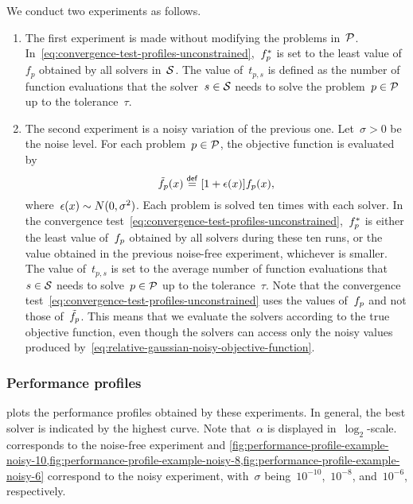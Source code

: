 We conduct two experiments as follows.
\begin{enumerate}
    \item The first experiment is made without modifying the problems in~$\mathcal{P}$.
    In~\cref{eq:convergence-test-profiles-unconstrained},~$f_p^{\ast}$ is set to the least value of~$f_p$ obtained by all solvers in~$\mathcal{S}$.
    The value of~$t_{p, s}$ is defined as the number of function evaluations that the solver~$s \in \mathcal{S}$ needs to solve the problem~$p \in \mathcal{P}$ up to the tolerance~$\tau$.
    \item The second experiment is a noisy variation of the previous one.
    Let~$\sigma > 0$ be the noise level.
    For each problem~$p \in \mathcal{P}$, the objective function is evaluated by
    \begin{equation}
        \label{eq:relative-gaussian-noisy-objective-function}
        \tilde{\obj}_p(\iter) \eqdef [1 + \epsilon(\iter)] \obj_p(\iter),
    \end{equation}
    where~$\epsilon(\iter) \sim N(0, \sigma^2)$.
    Each problem is solved ten times with each solver.
    In the convergence test~\cref{eq:convergence-test-profiles-unconstrained},~$f_p^{\ast}$ is either the least value of~$f_p$ obtained by all solvers during these ten runs, or the value obtained in the previous noise-free experiment, whichever is smaller.
    The value of~$t_{p, s}$ is set to the average number of function evaluations that~$s \in \mathcal{S}$ needs to solve~$p \in \mathcal{P}$ up to the tolerance~$\tau$.
    Note that the convergence test~\cref{eq:convergence-test-profiles-unconstrained} uses the values of~$f_p$ and not those of~$\tilde{f}_p$.
    This means that we evaluate the solvers according to the true objective function, even though the solvers can access only the noisy values produced by~\cref{eq:relative-gaussian-noisy-objective-function}.
\end{enumerate}

\subsubsection{Performance profiles}

 plots the performance profiles obtained by these experiments.
In general, the best solver is indicated by the highest curve.
Note that~$\alpha$ is displayed in~$\log_2$-scale.
 corresponds to the noise-free experiment and \cref{fig:performance-profile-example-noisy-10,fig:performance-profile-example-noisy-8,fig:performance-profile-example-noisy-6} correspond to the noisy experiment, with~$\sigma$ being~$10^{-10}$,~$10^{-8}$, and~$10^{-6}$, respectively.

